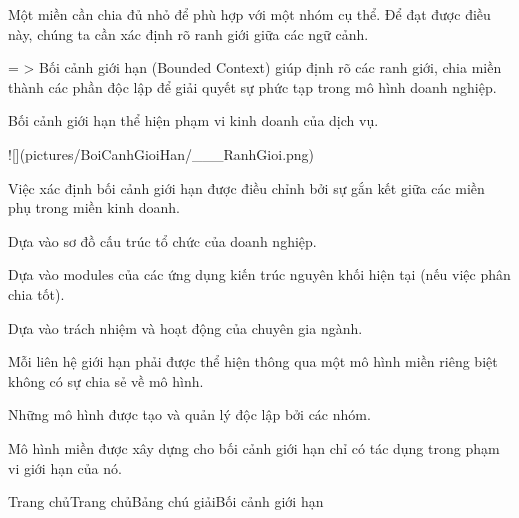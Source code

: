 
Một miền cần chia đủ nhỏ để phù hợp với một nhóm cụ thể. Để đạt được điều này, chúng ta cần xác định rõ ranh giới giữa các ngữ cảnh.

= > Bối cảnh giới hạn (Bounded Context) giúp định rõ các ranh giới, chia miền thành các phần độc lập để giải quyết sự phức tạp trong mô hình doanh nghiệp.

Bối cảnh giới hạn thể hiện phạm vi kinh doanh của dịch vụ.

![](pictures/BoiCanhGioiHan/___RanhGioi.png)



Việc xác định bối cảnh giới hạn được điều chỉnh bởi sự gắn kết giữa các miền phụ trong miền kinh doanh.

Dựa vào sơ đồ cấu trúc tổ chức của doanh nghiệp.

Dựa vào modules của các ứng dụng kiến trúc nguyên khối hiện tại (nếu việc phân chia tốt).

Dựa vào trách nhiệm và hoạt động của chuyên gia ngành.


Mỗi liên hệ giới hạn phải được thể hiện thông qua một mô hình miền riêng biệt không có sự chia sẻ về mô hình.


Những mô hình được tạo và quản lý độc lập bởi các nhóm.


Mô hình miền được xây dựng cho bối cảnh giới hạn chỉ có tác dụng trong phạm vi giới hạn của nó.





Trang chủTrang chủBảng chú giảiBối cảnh giới hạn

